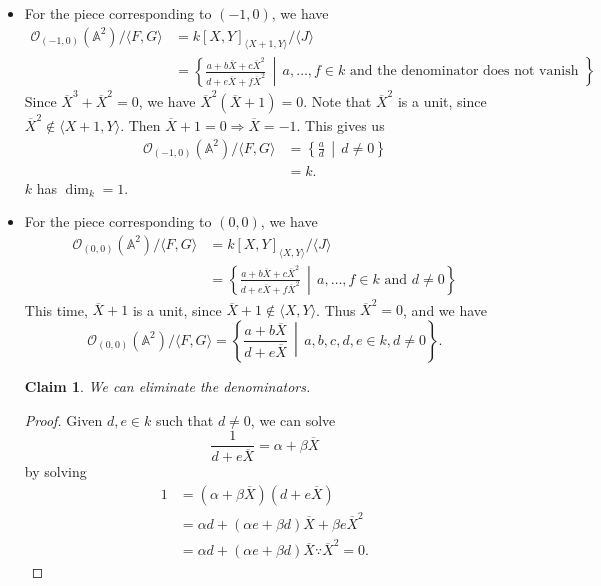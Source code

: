 \documentclass[12pt]{article}
\newcommand{\vbrack}[1]{\langle #1\rangle}
\newtheorem*{claim}{Claim}
\theoremstyle{definition}
\begin{document}
\begin{itemize}
    \item For the piece corresponding to $(-1,0)$, we have
    \begin{align*}
        \mathcal{O}_{(-1,0)}(\mathbb{A}^2)/\vbrack{F,G}&=k[X,Y]_{\vbrack{X+1,Y}}/\vbrack{J}\\
        &=\left\{\frac{a+b\overline{X}+c\overline{X}^2}{d+e\overline{X}+f\overline{X}^2}\,\middle|\,a,\dotsc,f\in k\text{ and the denominator does not vanish }\right\}
    \end{align*}
    Since $\overline{X}^3+\overline{X}^2=0$, we have $\overline{X}^2(\overline{X}+1)=0$. Note that $\overline{X}^2$ is a unit, since $\overline{X}^2\notin\vbrack{X+1,Y}$. Then $\overline{X}+1=0\Rightarrow\overline{X}=-1$. This gives us
    \begin{align*}
        \mathcal{O}_{(-1,0)}(\mathbb{A}^2)/\vbrack{F,G}&=\left\{\frac{a}{d}\,\middle|\,d\neq0\right\}\\
        &=k.
    \end{align*}
    $k$ has $\dim_k=1$.
    \item For the piece corresponding to $(0,0)$, we have
    \begin{align*}
        \mathcal{O}_{(0,0)}(\mathbb{A}^2)/\vbrack{F,G}&=k[X,Y]_{\vbrack{X,Y}}/\vbrack{J}\\
        &=\left\{\frac{a+b\overline{X}+c\overline{X}^2}{d+e\overline{X}+f\overline{X}^2}\,\middle|\,a,\dotsc,f\in k\text{ and }d\neq0\right\}
    \end{align*}
    This time, $\overline{X}+1$ is a unit, since $\overline{X}+1\notin\vbrack{X,Y}$. Thus $\overline{X}^2=0$, and we have
    \[\mathcal{O}_{(0,0)}(\mathbb{A}^2)/\vbrack{F,G}=\left\{\frac{a+b\overline{X}}{d+e\overline{X}}\,\middle|\,a,b,c,d,e\in k,d\neq0\right\}.\]
    \begin{claim}
        We can eliminate the denominators.
    \end{claim}
    \begin{proof}
        Given $d,e\in k$ such that $d\neq0$, we can solve 
        \[\frac{1}{d+e\overline{X}}=\alpha+\beta\overline{X}\]
        by solving 
        \begin{align*}
            1&=(\alpha+\beta\overline{X})(d+e\overline{X})\\
            &=\alpha d+(\alpha e+\beta d)\overline{X}+\beta e\overline{X}^2\\
            &=\alpha d+(\alpha e+\beta d)\overline{X}\because\overline{X}^2=0.
        \end{align*}

\end{proof}
\end{itemize}
\end{document}
